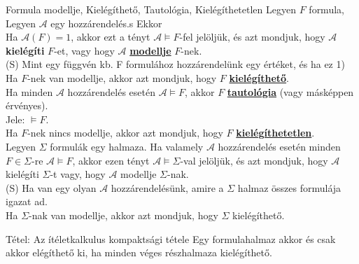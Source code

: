 \documentclass{beamer}
\begin{document}
\begin{frame}

\begin{block}{Formula modellje, Kielégíthető, Tautológia, Kielégíthetetlen}
Legyen $F$ formula, Legyen $\mathcal{A}$ egy hozzárendelés.s Ekkor\\
\bigskip
Ha $\mathcal{A}(F) = 1$, akkor ezt a tényt $\mathcal{A} \models F$-fel jelöljük, és azt mondjuk, hogy $\mathcal{A}$ \textbf{kielégíti} $F$-et, vagy hogy $\mathcal{A}$ \underline{\textbf{modellje}} $F$-nek.\\
{\tiny (S) Mint egy függvén kb. F formulához hozzárendelünk egy értéket, és ha ez 1)}\\
\bigskip
Ha $F$-nek van modellje, akkor azt mondjuk, hogy $F$ \underline{\textbf{kielégíthető}}.\\
\bigskip
Ha minden $\mathcal{A}$ hozzárendelés esetén $\mathcal{A} \models F$, akkor $F$ \underline{\textbf{tautológia}} (vagy másképpen érvényes).\\
Jele: $\models F$.\\
\bigskip
Ha $F$-nek nincs modellje, akkor azt mondjuk, hogy $F$ \underline{\textbf{kielégíthetetlen}}.\\
\bigskip
Legyen $\Sigma$ formulák egy halmaza. Ha valamely $\mathcal{A}$ hozzárendelés esetén minden $F \in \Sigma$-re $\mathcal{A} \models F$, akkor ezen tényt $\mathcal{A} \models \Sigma$-val jelöljük, és azt mondjuk, hogy $\mathcal{A}$ kielégíti $\Sigma$-t vagy, hogy $\mathcal{A}$ modellje $\Sigma$-nak.\\
{\tiny (S) Ha van egy olyan $\mathcal{A}$ hozzárendelésünk, amire a $\Sigma$ halmaz összes formulája igazat ad.}\\
\bigskip
Ha $\Sigma$-nak van modellje, akkor azt mondjuk, hogy $\Sigma$ kielégíthető.
\end{block}

\end{frame}

\begin{frame}

\begin{block}{Tétel: Az ítéletkalkulus kompaktsági tétele}
Egy formulahalmaz akkor és csak akkor elégíthető ki, ha minden véges részhalmaza kielégíthető.

\end{block}

\end{frame}
\end{document}
